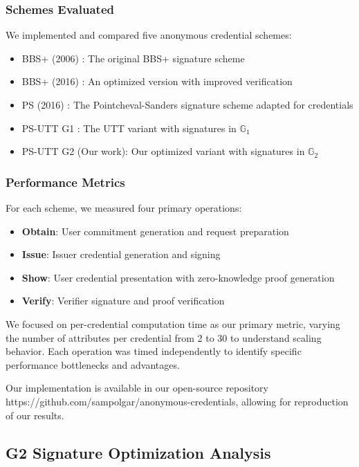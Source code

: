 \subsubsection{Schemes Evaluated}
We implemented and compared five anonymous credential schemes:
\begin{itemize}
    \item BBS+ (2006) \cite{hutchison_constant-size_2006}: The original BBS+ signature scheme
    \item BBS+ (2016) \cite{camenisch_anonymous_2016}: An optimized version with improved verification
    \item PS (2016) \cite{sako_short_2016}: The Pointcheval-Sanders signature scheme adapted for credentials
    \item PS-UTT G1 \cite{tomescu_utt_2022}: The UTT variant with signatures in $\mathbb{G}_1$
    \item PS-UTT G2 (Our work): Our optimized variant with signatures in $\mathbb{G}_2$
\end{itemize}

\subsubsection{Performance Metrics}
For each scheme, we measured four primary operations:
\begin{itemize}
    \item \textbf{Obtain}: User commitment generation and request preparation
    \item \textbf{Issue}: Issuer credential generation and signing
    \item \textbf{Show}: User credential presentation with zero-knowledge proof generation
    \item \textbf{Verify}: Verifier signature and proof verification
\end{itemize}

We focused on per-credential computation time as our primary metric, varying the number of attributes per credential from 2 to 30 to understand scaling behavior. Each operation was timed independently to identify specific performance bottlenecks and advantages.

Our implementation is available in our open-source repository https://github.com/sampolgar/anonymous-credentials, allowing for reproduction of our results.




\subsection{G2 Signature Optimization Analysis}\

